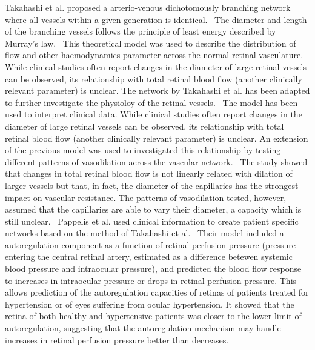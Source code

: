 \documentclass[12pt,a4paper]{journal}
\begin{document}
Takahashi et al. proposed a arterio-venous dichotomously branching network where all vessels within a given generation is identical.~\cite{Takahashi_2009}
The diameter and length of the branching vessels follows the principle of least energy described by Murray's law.~\cite{Murray_1926}
This theoretical model was used to describe the distribution of flow and other haemodynamics parameter across the normal retinal vasculature.
While clinical studies often report changes in the diameter of large retinal vessels can be observed, its relationship with total retinal blood flow (another clinically relevant parameter) is unclear.
The network by Takahashi et al. has been adapted to further investigate the physioloy of the retinal vessels.~\cite{Aschinger_2017,Pappelis_2020}
The model has been used to interpret clinical data.
While clinical studies often report changes in the diameter of large retinal vessels can be observed, its relationship with total retinal blood flow (another clinically relevant parameter) is unclear.
An extension of the previous model was used to investigated this relationship by testing different patterns of vasodilation across the vascular network.~\cite{Aschinger_2017}
The study showed that changes in total retinal blood flow is not linearly related with dilation of larger vessels but that, in fact, the diameter of the capillaries has the strongest impact on vascular resistance.
The patterns of vasodilation tested, however, assumed that the capillaries are able to vary their diameter, a capacity which is still unclear.~\cite{Kur_2012}
Pappelis et al. used clinical information to create patient specific networks based on the method of Takahashi et al.~\cite{Pappelis_2020}
Their model included a autoregulation component as a function of retinal perfusion pressure (pressure entering the central retinal artery, estimated as a difference betewen systemic blood pressure and intraocular pressure), and predicted the blood flow response to increases in intraocular pressure or drops in retinal perfusion pressure.
This allows prediction of the autoregulation capacities of retinas of patients treated for hypertension or of eyes suffering from ocular hypertension.
It showed that the retina of both healthy and hypertensive patients was closer to the lower limit of autoregulation, suggesting that the autoregulation mechanism may handle increases in retinal perfusion pressure better than decreases.~\cite{Pappelis_2020}
\end{document}

